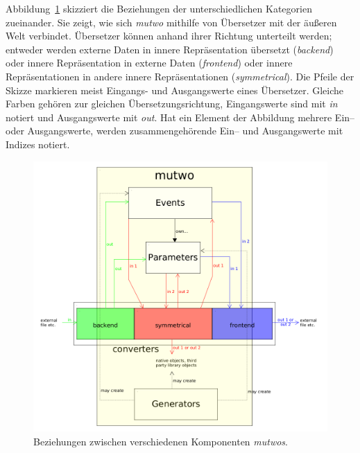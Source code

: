 \documentclass[12pt,a4paper,ngerman]{article}
\begin{document}
\vspace{0.2cm}
\bigskip

Abbildung~\ref{fig:mutwoStructure} skizziert die Beziehungen der unterschiedlichen Kategorien zueinander.
Sie zeigt, wie sich \emph{mutwo} mithilfe von Übersetzer mit der äußeren Welt verbindet.
Übersetzer können anhand ihrer Richtung unterteilt werden;
entweder werden externe Daten in innere Repräsentation übersetzt (\emph{backend}) oder innere Repräsentation in externe Daten (\emph{frontend}) oder innere Repräsentationen in andere innere Repräsentationen (\emph{symmetrical}).
Die Pfeile der Skizze markieren meist Eingangs- und Ausgangswerte eines Übersetzer.
Gleiche Farben gehören zur gleichen Übersetzungsrichtung, Eingangswerte sind mit \emph{in} notiert und Ausgangswerte mit \emph{out}.
Hat ein Element der Abbildung mehrere Ein-- oder Ausgangswerte, werden zusammengehörende Ein-- und Ausgangswerte mit Indizes notiert.

\begin{figure}[H]
    \begin{center}
        \includegraphics[scale=0.38]{pictures/mutwo-structure.png}
    \end{center}
    \caption{%
        Beziehungen zwischen verschiedenen Komponenten \emph{mutwos}.
    }
    \label{fig:mutwoStructure}
\end{figure}
\end{document}

